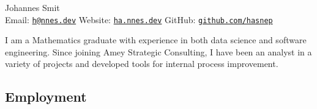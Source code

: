 \documentclass[11pt, a4paper]{article}
\begin{document}
\begin{center}
	{\huge Johannes Smit \\}
	\vspace{1em}
	{\large
	Email: \href{mailto:h@nnes.dev}{\nolinkurl{h@nnes.dev}} 
	\hfill
	Website: \href{https://ha.nnes.dev/}{\nolinkurl{ha.nnes.dev}}
	\hfill
	GitHub: \href{https://github.com/hasnep/}{\nolinkurl{github.com/hasnep}}
	\\
	}
\end{center}

I am a Mathematics graduate with experience in both data science and software engineering.
Since joining Amey Strategic Consulting, I have been an analyst in a variety of projects and developed tools for internal process improvement.

\subsection*{Employment}
\end{document}

